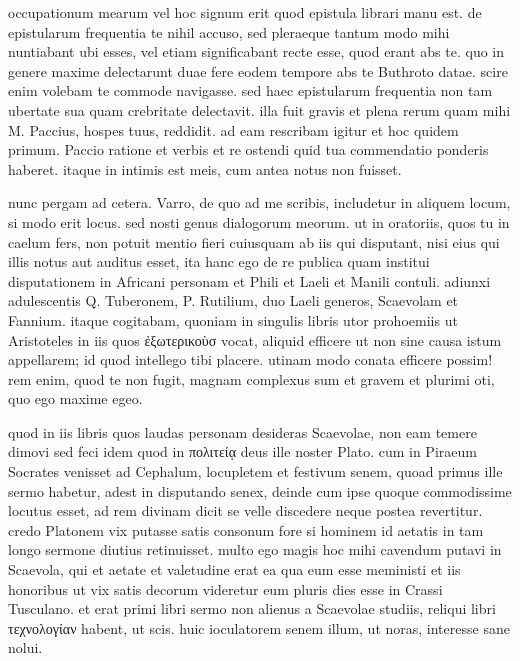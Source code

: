 


 occupationum mearum vel hoc signum erit quod epistula librari manu est. de epistularum frequentia te nihil accuso, sed pleraeque tantum modo mihi nuntiabant ubi esses, vel etiam significabant recte esse, quod erant abs te. quo in genere maxime delectarunt duae fere eodem tempore abs te Buthroto datae. scire enim volebam te commode navigasse. sed haec epistularum frequentia non tam ubertate sua quam crebritate delectavit. illa fuit gravis et plena rerum quam mihi M. Paccius, hospes tuus, reddidit. ad eam rescribam igitur et hoc quidem primum. Paccio ratione et verbis et re ostendi quid tua commendatio ponderis haberet. itaque in intimis est meis, cum antea notus non fuisset.

 nunc pergam ad cetera. Varro, de quo ad me scribis, includetur in aliquem locum, si modo erit locus. sed nosti genus dialogorum meorum. ut in oratoriis, quos tu in caelum fers, non potuit mentio fieri cuiusquam ab iis qui disputant, nisi eius qui illis notus aut auditus esset, ita hanc ego de re publica quam institui disputationem in Africani personam et Phili et Laeli et Manili contuli. adiunxi adulescentis Q. Tuberonem, P. Rutilium, duo Laeli generos, Scaevolam et Fannium. itaque cogitabam, quoniam in singulis libris utor prohoemiis ut Aristoteles in iis quos ἐξωτερικοὺσ vocat, aliquid efficere ut non sine causa istum appellarem; id quod intellego tibi placere. utinam modo conata efficere possim! rem enim, quod te non fugit, magnam complexus sum et gravem et plurimi oti, quo ego maxime egeo.

 quod in iis libris quos laudas personam desideras Scaevolae, non eam temere dimovi sed feci idem quod in πολιτείᾳ deus ille noster Plato. cum in Piraeum Socrates venisset ad Cephalum, locupletem et festivum senem, quoad primus ille sermo habetur, adest in disputando senex, deinde cum ipse quoque commodissime locutus esset, ad rem divinam dicit se velle discedere neque postea revertitur. credo Platonem vix putasse satis consonum fore si hominem id aetatis in tam longo sermone diutius retinuisset. multo ego magis hoc mihi cavendum putavi in Scaevola, qui et aetate et valetudine erat ea qua eum esse meministi et iis honoribus ut vix satis decorum videretur eum pluris dies esse in Crassi Tusculano. et erat primi libri sermo non alienus a Scaevolae studiis, reliqui libri τεχνολογίαν habent, ut scis. huic ioculatorem senem illum, ut noras, interesse sane nolui.

